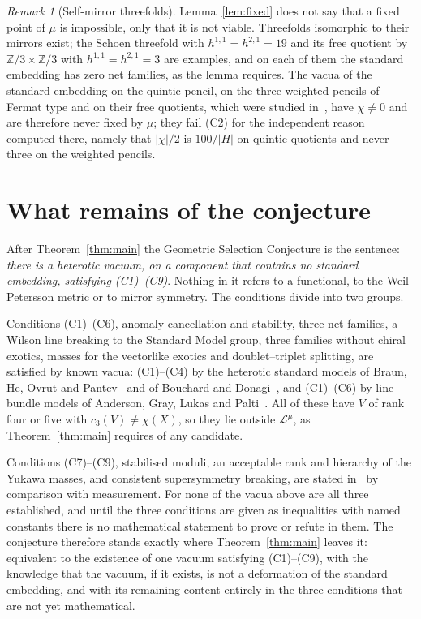 \documentclass[11pt]{amsart}
\theoremstyle{definition}
\theoremstyle{remark}
\newtheorem{remark}[theorem]{Remark}
\newcommand{\cL}{\mathcal{L}}
\newcommand{\Z}{\mathbb{Z}}
\begin{document}
\begin{remark}[Self-mirror threefolds]
Lemma~\ref{lem:fixed} does not say that a fixed point of $\mu$ is impossible,
only that it is not viable. Threefolds isomorphic to their mirrors exist; the
Schoen threefold with $h^{1,1}=h^{2,1}=19$ and its free quotient by
$\Z/3\times\Z/3$ with $h^{1,1}=h^{2,1}=3$ are examples, and on each of them the
standard embedding has zero net families, as the lemma requires. The vacua of
the standard embedding on the quintic pencil, on the three weighted pencils of
Fermat type and on their free quotients, which were studied in~\cite{BB26},
have $\chi\ne0$ and are therefore never fixed by $\mu$; they fail (C2) for
the independent reason computed there, namely that $|\chi|/2$ is $100/|H|$ on
quintic quotients and never three on the weighted pencils.
\end{remark}

\section{What remains of the conjecture}\label{sec:remains}

After Theorem~\ref{thm:main} the Geometric Selection Conjecture is the
sentence: \emph{there is a heterotic vacuum, on a component that contains no
standard embedding, satisfying \textup{(C1)}--\textup{(C9)}}. Nothing in it refers to a
functional, to the Weil--Petersson metric or to mirror symmetry. The
conditions divide into two groups.

Conditions (C1)--(C6), anomaly cancellation and stability, three net
families, a Wilson line breaking to the Standard Model group, three families
without chiral exotics, masses for the vectorlike exotics and doublet--triplet
splitting, are satisfied by known vacua: (C1)--(C4) by the heterotic standard
models of Braun, He, Ovrut and Pantev~\cite{BHOP05} and of Bouchard and
Donagi~\cite{BD06}, and (C1)--(C6) by line-bundle models of Anderson, Gray,
Lukas and Palti~\cite{AGLP11,AGLP12}. All of these have $V$ of rank four or
five with $c_3(V)\ne\chi(X)$, so they lie outside $\cL^\mu$, as
Theorem~\ref{thm:main} requires of any candidate.

Conditions (C7)--(C9), stabilised moduli, an acceptable rank and hierarchy of
the Yukawa masses, and consistent supersymmetry breaking, are stated
in~\cite{Bha26a} by comparison with measurement. For none of the vacua above
are all three established, and until the three conditions are given as
inequalities with named constants there is no mathematical statement to
prove or refute in them. The conjecture therefore stands exactly where
Theorem~\ref{thm:main} leaves it: equivalent to the existence of one vacuum
satisfying (C1)--(C9), with the knowledge that the vacuum, if it exists, is
not a deformation of the standard embedding, and with its remaining content
entirely in the three conditions that are not yet mathematical.
\end{document}
